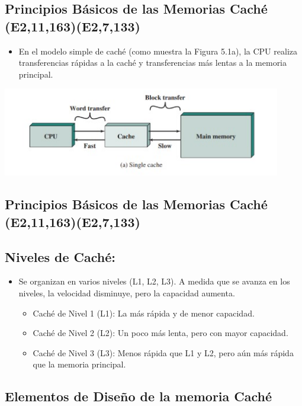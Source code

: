 \documentclass[presentation]{beamer}
\begin{document}
\subsection{Principios Básicos de las Memorias Caché (E2,11,163)(E2,7,133)}
\label{sec:org85b7ace}

\begin{itemize}
\item En el modelo simple de caché (como muestra la Figura 5.1a), la CPU realiza transferencias rápidas a la caché y transferencias más lentas a la memoria principal.
\end{itemize}

\begin{center}
\includegraphics[width=.9\linewidth]{./Imagenes/captura1.png}
\end{center}


\subsection{Principios Básicos de las Memorias Caché (E2,11,163)(E2,7,133)}
\label{sec:orga82a7e4}

\subsection{Niveles de Caché:}
\label{sec:org9a0a093}
\begin{itemize}
\item Se organizan en varios niveles (L1, L2, L3). A medida que se avanza en los niveles, la velocidad disminuye, pero la capacidad aumenta.
\begin{itemize}
\item Caché de Nivel 1 (L1): La más rápida y de menor capacidad.
\item Caché de Nivel 2 (L2): Un poco más lenta, pero con mayor capacidad.
\item Caché de Nivel 3 (L3): Menos rápida que L1 y L2, pero aún más rápida que la memoria principal.
\end{itemize}
\end{itemize}


\subsection{Elementos de Diseño de la memoria Caché}
\label{sec:org0a30f60}
\end{document}
